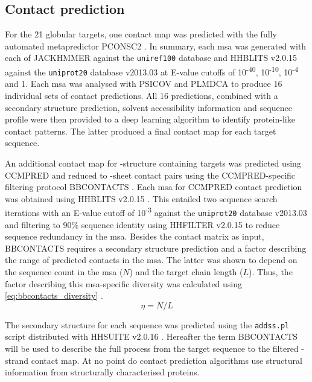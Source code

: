 \subsection{Contact prediction}
For the 21 globular targets, one contact map was predicted with the fully automated metapredictor PCONSC2 \cite{Skwark2014-qp}. In summary, each \gls{msa} was generated with each of JACKHMMER  \cite{Johnson2010-uz} against the \texttt{uniref100} database and HHBLITS v2.0.15 \cite{Remmert2011-kt} against the \texttt{uniprot20} database v2013.03 \cite{Bateman2017-pb} at E-value cutoffs of 10\textsuperscript{-40}, 10\textsuperscript{-10}, 10\textsuperscript{-4} and 1. Each \gls{msa} was analysed with PSICOV \cite{Jones2012-ks} and PLMDCA \cite{Ekeberg2014-kf} to produce 16 individual sets of contact predictions. All 16 predictions, combined with a secondary structure prediction, solvent accessibility information and sequence profile were then provided to a deep learning algorithm \cite{Skwark2014-qp} to identify protein-like contact patterns. The latter produced a final contact map for each target sequence. 

An additional contact map for \textbeta-structure containing targets was predicted using CCMPRED \cite{Seemayer2014-zp} and reduced to \textbeta-sheet contact pairs using the CCMPRED-specific filtering protocol BBCONTACTS \cite{Andreani2015-qn}. Each \gls{msa} for CCMPRED contact prediction was obtained using HHBLITS v2.0.15 \cite{Remmert2011-kt}. This entailed two sequence search iterations with an E-value cutoff of 10\textsuperscript{-3} against the \texttt{uniprot20} database v2013.03 \cite{Bateman2017-pb} and filtering to 90\% sequence identity using HHFILTER v2.0.15 \cite{Remmert2011-kt} to reduce sequence redundancy in the \gls{msa}. Besides the contact matrix as input, BBCONTACTS requires a secondary structure prediction and a factor describing the range of predicted contacts in the \gls{msa}. The latter was shown to depend on the sequence count in the \gls{msa} ($N$) and the target chain length ($L$). Thus, the factor describing this \gls{msa}-specific diversity was calculated using \cref{eq:bbcontacts_diversity} \cite{Andreani2015-qn}. 
\begin{equation}
    \eta=N/L 
    \label{eq:bbcontacts_diversity}
\end{equation}

The secondary structure for each sequence was predicted using the \texttt{addss.pl} \cite{Remmert2011-kt} script distributed with HHSUITE v2.0.16 \cite{Soding2005-hw}. Hereafter the term BBCONTACTS will be used to describe the full process from the target sequence to the filtered \textbeta-strand contact map. At no point do contact prediction algorithms use structural information from structurally characterised proteins.


